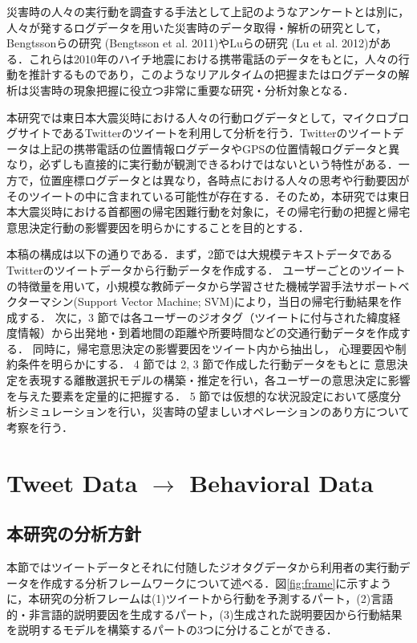 \documentclass[japanese]{jnlp_1.4}
\begin{document}
災害時の人々の実行動を調査する手法として上記のようなアンケートとは別に，人々が発するログデータを用いた災害時のデータ取得・解析の研究として，
Bengtssonらの研究 (Bengtsson et al. 2011)やLuらの研究 (Lu et al.  2012)がある．これらは2010年のハイチ地震における携帯電話のデータをもとに，人々の行動を推計するものであり，このようなリアルタイムの把握またはログデータの解析は災害時の現象把握に役立つ非常に重要な研究・分析対象となる．

本研究では東日本大震災時における人々の行動ログデータとして，マイクロブログサイトであるTwitterのツイートを利用して分析を行う．Twitterのツイートデータは上記の携帯電話の位置情報ログデータやGPSの位置情報ログデータと異なり，必ずしも直接的に実行動が観測できるわけではないという特性がある．一方で，位置座標ログデータとは異なり，各時点における人々の思考や行動要因がそのツイートの中に含まれている可能性が存在する．そのため，本研究では東日本大震災時における首都圏の帰宅困難行動を対象に，その帰宅行動の把握と帰宅意思決定行動の影響要因を明らかにすることを目的とする．

本稿の構成は以下の通りである．まず，2節では大規模テキストデータであるTwitterのツイートデータから行動データを作成する．
ユーザーごとのツイートの特徴量を用いて，小規模な教師データから学習させた機械学習手法サポートベクターマシン(Support Vector Machine; SVM)により，当日の帰宅行動結果を作成する．
次に，3 節では各ユーザーのジオタグ（ツイートに付与された緯度経度情報）から出発地・到着地間の距離や所要時間などの交通行動データを作成する．
同時に，帰宅意思決定の影響要因をツイート内から抽出し，
心理要因や制約条件を明らかにする．
4 節では 2, 3 節で作成した行動データをもとに
意思決定を表現する離散選択モデルの構築・推定を行い，各ユーザーの意思決定に影響を与えた要素を定量的に把握する．
5 節では仮想的な状況設定において感度分析シミュレーションを行い，災害時の望ましいオペレーションのあり方について考察を行う．


\section{Tweet Data $\rightarrow$ Behavioral Data}

\subsection{本研究の分析方針}

本節ではツイートデータとそれに付随したジオタグデータから利用者の実行動データを作成する分析フレームワークについて述べる．図\ref{fig:frame}に示すように，本研究の分析フレームは(1)ツイートから行動を予測するパート，(2)言語的・非言語的説明要因を生成するパート，(3)生成された説明要因から行動結果を説明するモデルを構築するパートの$3$つに分けることができる．
\end{document}
